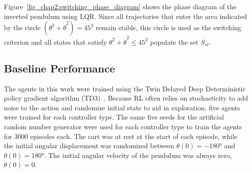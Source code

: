 %
Figure~\ref{fig_chap2:switching_phase_diagram} shows the phase diagram of the inverted pendulum using LQR. Since all trajectories that enter the area indicated by the circle $(\theta^2+\dot{\theta}^2)=45^2$ remain stable, this circle is used as the switching criterion and all states that satisfy $\theta^2+\dot{\theta}^2\leq45^2$ populate the set $S_{st}$.
%
%
%

\subsection{Baseline Performance}

The agents in this work were trained using the Twin Delayed Deep Deterministic policy gradient algorithm (TD3)~\cite{Fujimoto:2018a}. Because RL often relies on stochasticity to add noise to the action and randomize initial state to aid in exploration, five agents were trained for each controller type. The same five seeds for the artificial random number generator were used for each controller type to train the agents for 3000 episodes each.
%
The cart was at rest at the start of each episode, while the initial angular displacement was randomized between $\theta(0)=-180\si{\degree}$ and $\theta(0)=180\si{\degree}$. The initial angular velocity of the pendulum was always zero, $\dot{\theta}(0)=0$.

